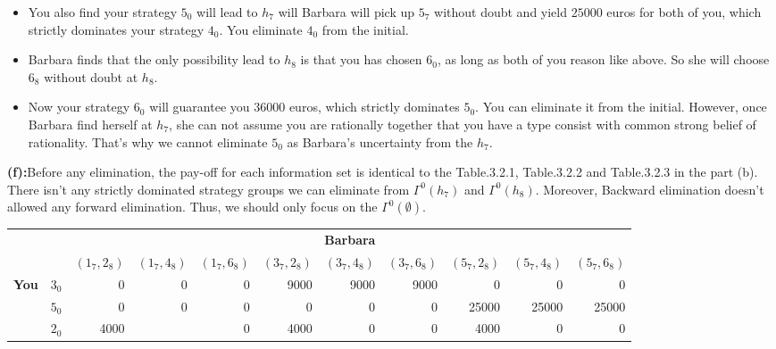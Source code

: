 \documentclass{article}
\begin{document}
\begin{description}
\begin{itemize}
      \item You also find your strategy $5_0$ will lead to $h_7$ will Barbara will pick up $5_7$ without doubt and yield $25000$ euros for both of you, which strictly dominates your strategy $4_0$. You eliminate $4_0$ from the initial.
      \item Barbara finds that the only possibility lead to $h_8$ is that you has chosen $6_0$, as long as both of you reason like above. So she will choose $6_8$ without doubt at $h_8$.
      \item Now your strategy $6_0$ will guarantee you $36000$ euros, which strictly dominates $5_0$. You can eliminate it from the initial. However, once Barbara find herself at $h_7$, she can not assume you are rationally together that you have a type consist with common strong belief of rationality. That's why we cannot eliminate $5_0$ as Barbara's uncertainty from the $h_7$.
    \end{itemize}
    {\bf (f):}Before any elimination, the pay-off for each information set is identical to the Table.3.2.1, Table.3.2.2 and Table.3.2.3 in the part (b). There isn't any strictly dominated strategy groups we can eliminate from $\Gamma ^{0}(h_7)$ and $\Gamma ^{0}(h_8)$. Moreover, Backward elimination doesn't allowed any forward elimination. Thus, we should only focus on the $\Gamma ^{0}(\emptyset )$.
        \begin{center}
        \begin{tabular}{rrrrrrrrrrr}
        \hline
        \hline
                   &            &                                                                                 \multicolumn{ 9}{c}{{\bf Barbara}} \\

                   &            &  $(1_7,2_8)$ &  $(1_7,4_8)$ &  $(1_7,6_8)$ &  $(3_7,2_8)$ &  $(3_7,4_8)$ &  $(3_7,6_8)$ &  $(5_7,2_8)$ &  $(5_7,4_8)$ &  $(5_7,6_8)$ \\
        \hline
        \multicolumn{ 1}{c}{{\bf You}} &        $3_0$ &          0 &          0 &          0 &       9000 &       9000 &       9000 &          0 &          0 &          0 \\

        \multicolumn{ 1}{c}{{\bf }} &        $5_0$ &          0 &          0 &          0 &          0 &          0 &          0 &      25000 &      25000 &      25000 \\

        \multicolumn{ 1}{c}{{\bf }} &        $2_0$ &       4000 &            &          0 &       4000 &          0 &          0 &       4000 &          0 &          0 \\


\end{tabular}
\end{center}
\end{description}
\end{document}
